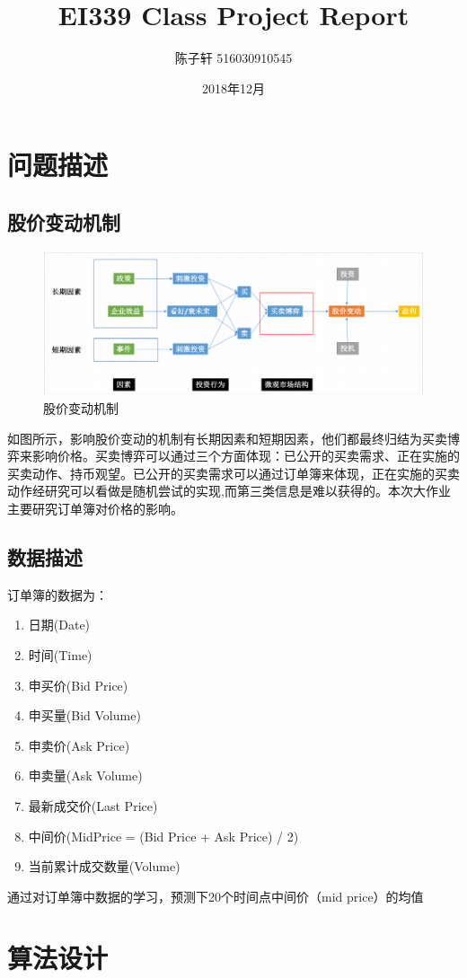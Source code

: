 \documentclass[UTF8]{ctexart}
\title{EI339 Class Project Report}
\author{陈子轩 516030910545}
\date{2018年12月}
\begin{document}
\maketitle
\tableofcontents
\section{问题描述}
\subsection{股价变动机制}
\begin{figure}[!htbp]
\centering
\includegraphics[scale = 0.6]{p1.png}
\caption{股价变动机制}
\end{figure}
如图所示，影响股价变动的机制有长期因素和短期因素，他们都最终归结为买卖博弈来影响价格。买卖博弈可以通过三个方面体现：已公开的买卖需求、正在实施的买卖动作、持币观望。已公开的买卖需求可以通过订单簿来体现，正在实施的买卖动作经研究可以看做是随机尝试的实现,而第三类信息是难以获得的。本次大作业主要研究订单簿对价格的影响。
\subsection{数据描述}
订单簿的数据为：
\begin{enumerate}[*]
    \item 日期(Date)
    \item 时间(Time)
    \item 申买价(Bid Price)
    \item 申买量(Bid Volume)
    \item 申卖价(Ask Price)
    \item 申卖量(Ask Volume)
    \item 最新成交价(Last Price)
    \item 中间价(MidPrice = (Bid Price + Ask Price) / 2)
    \item 当前累计成交数量(Volume)
\end{enumerate}
通过对订单簿中数据的学习，预测下20个时间点中间价（mid price）的均值
\section{算法设计}
\end{document}
